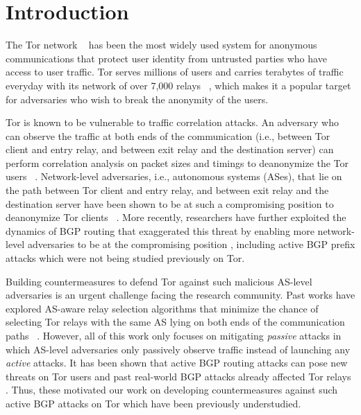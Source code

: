 \section{Introduction}

The Tor network ~\cite{dingledine2004tor} has been the most widely used system for anonymous communications that protect user identity from untrusted parties who have access to user traffic. Tor serves millions of users and carries terabytes of traffic everyday with its network of over 7,000 relays ~\cite{tormetrics}, which makes it a popular target for adversaries who wish to break the anonymity of the users. 

Tor is known to be vulnerable to traffic correlation attacks. An adversary who can observe the traffic at both ends of the communication (i.e., between Tor client and entry relay, and between exit relay and the destination server) can perform  correlation analysis on packet sizes and timings to deanonymize the Tor users ~\cite{shmatikov2006timing, syverson2001towards}. Network-level adversaries, i.e., autonomous systems (ASes), that lie on the path between Tor client and entry relay, and between exit relay and the destination server have been shown to be at such a compromising position to deanonymize Tor clients ~\cite{edman2009awareness, feamster2004location, johnson2013users}. More recently, researchers have further exploited the dynamics of BGP routing that exaggerated this threat by enabling more network-level adversaries to be at the compromising position \cite{sun2015raptor}, including active BGP prefix attacks which were not being studied previously on Tor. 

Building countermeasures to defend Tor against such malicious AS-level adversaries is an urgent challenge facing the research community. Past works have explored AS-aware relay selection algorithms that minimize the chance of selecting Tor relays with the same AS lying on both ends of the communication paths ~\cite{akhoondi2012lastor, edman2009awareness, starov2015measuring}. However, all of this work only focuses on mitigating \emph{passive} attacks in which AS-level adversaries only passively observe traffic instead of launching any \emph{active} attacks. It has been shown that active BGP routing attacks can pose new threats on Tor users and past real-world BGP attacks already affected Tor relays \cite{sun2015raptor}. Thus, these motivated our work on developing countermeasures against such active BGP attacks on Tor which have been previously understudied. 

